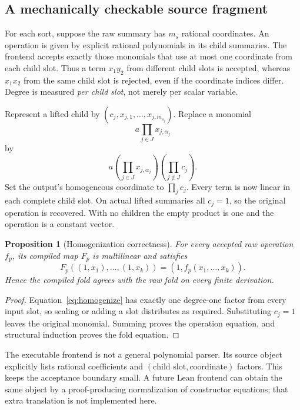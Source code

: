 \documentclass[11pt,letterpaper]{article}
\newtheorem{proposition}[theorem]{Proposition}
\theoremstyle{definition}\newtheorem{definition}[theorem]{Definition}
\theoremstyle{remark}\newtheorem{remark}[theorem]{Remark}
\begin{document}
\subsection{A mechanically checkable source fragment}
For each sort, suppose the raw summary has $m_s$ rational coordinates. An operation is given by explicit rational polynomials in its child summaries. The frontend accepts exactly those monomials that use at most one coordinate from each child slot. Thus a term $x_1y_2$ from different child slots is accepted, whereas $x_1x_2$ from the same child slot is rejected, even if the coordinate indices differ. Degree is measured \emph{per child slot}, not merely per scalar variable.

Represent a lifted child by $(c_j,x_{j,1},\ldots,x_{j,m_{s_j}})$. Replace a monomial
\[
 a\prod_{j\in J}x_{j,\alpha_j}
\]
by
\begin{equation}\label{eq:homogenize}
 a\left(\prod_{j\in J}x_{j,\alpha_j}\right)
   \left(\prod_{j\notin J}c_j\right).
\end{equation}
Set the output's homogeneous coordinate to $\prod_j c_j$. Every term is now linear in each complete child slot. On actual lifted summaries all $c_j=1$, so the original operation is recovered. With no children the empty product is one and the operation is a constant vector.

\begin{proposition}[Homogenization correctness]\label{prop:homogenize}
For every accepted raw operation $f_p$, its compiled map $F_p$ is multilinear and satisfies
\[
 F_p((1,x_1),\ldots,(1,x_k))=(1,f_p(x_1,\ldots,x_k)).
\]
Hence the compiled fold agrees with the raw fold on every finite derivation.
\end{proposition}
\begin{proof}
Equation~\eqref{eq:homogenize} has exactly one degree-one factor from every input slot, so scaling or adding a slot distributes as required. Substituting $c_j=1$ leaves the original monomial. Summing proves the operation equation, and structural induction proves the fold equation.
\end{proof}

The executable frontend is not a general polynomial parser. Its source object explicitly lists rational coefficients and $(\text{child slot},\text{coordinate})$ factors. This keeps the acceptance boundary small. A future Lean frontend can obtain the same object by a proof-producing normalization of constructor equations; that extra translation is not implemented here.
\end{document}
